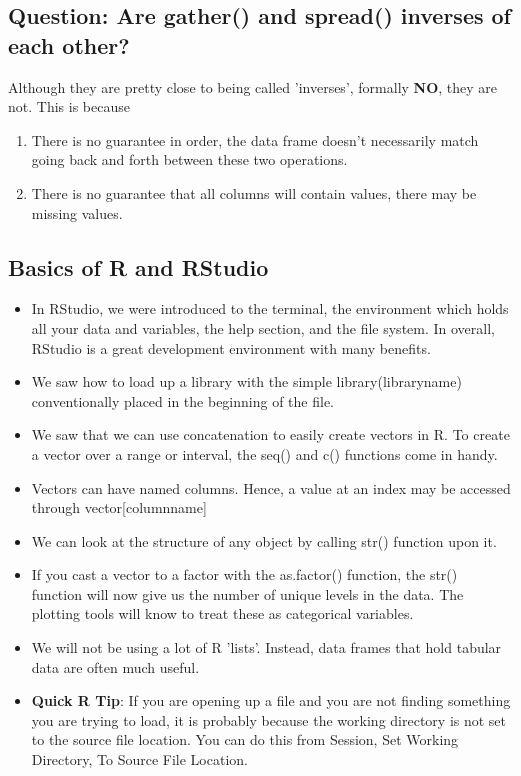 \subsection{Question: Are gather() and spread() inverses of each other?}
Although they are pretty close to being called 'inverses', formally \textbf{NO}, they are
not. This is because
\begin{enumerate}
    \item There is no guarantee in order, the data frame doesn't necessarily match going
    back and forth between these two operations. 
	\item There is no guarantee that all columns will contain values, there may be missing
	values.
\end{enumerate}

\subsection{Basics of R and RStudio}
\begin{itemize}
    \item In RStudio, we were introduced to the terminal, the environment which holds all
    your data and variables, the help section, and the file system. In overall, RStudio is
    a great development environment with many benefits.
    \item We saw how to load up a library with the simple library(libraryname)
    conventionally placed in the beginning of the file.
    \item We saw that we can use concatenation to easily create vectors in R. To create a
    vector over a range or interval, the seq() and c() functions come in handy.
    \item Vectors can have named columns. Hence, a value at an index may be accessed
    through vector[columnname]
    \item We can look at the structure of any object by calling str() function upon it. 
    \item If you cast a vector to a factor with the as.factor() function, the str()
    function will now give us the number of unique levels in the data. The plotting tools
    will know to treat these as categorical variables.
    \item We will not be using a lot of R 'lists'. Instead, data frames that hold tabular
    data are often much useful.
    \item \textbf{Quick R Tip}: If you are opening up a file and you are not finding
    something you are trying to load, it is probably because the working directory is not
    set to the source file location. You can do this from Session, Set Working Directory,
    To Source File Location.
\end{itemize}

